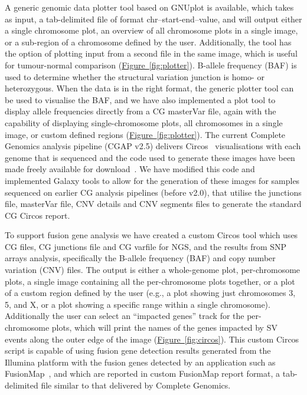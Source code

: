 A generic genomic data plotter tool based on GNUplot is available, which takes as input, a tab-delimited file of format chr–start-end–value, and will output either a single chromosome plot, an overview of all chromosome plots in a single image, or a sub-region of a chromosome defined by the user. Additionally, the tool has the option of plotting input from a second file in the same image, which is useful for tumour-normal comparison (\hyperref[fig:plotter]{Figure~\ref{fig:plotter}}). B-allele frequency (BAF) is used to determine whether the structural variation junction is homo- or heterozygous. When the data is in the right format, the generic plotter tool can be used to visualise the BAF, and we have also implemented a plot tool to display allele frequencies directly from a CG masterVar file, again with the capability of displaying single-chromosome plots, all chromosomes in a single image, or custom defined regions (\hyperref[fig:plotter]{Figure~\ref{fig:plotter}}). The current Complete Genomics analysis pipeline (CGAP v2.5) delivers Circos~\cite{url-circos} visualisations with each genome that is sequenced and the code used to generate these images have been made freely available for download~\cite{url-cgcircos}. We have modified this code and implemented Galaxy tools to allow for the generation of these images for samples sequenced on earlier CG analysis pipelines (before v2.0), that utilise the junctions file, masterVar file, CNV details and CNV segments files to generate the standard CG Circos report.


To support fusion gene analysis we have created a custom Circos tool which uses CG files, CG junctions file and CG varfile for NGS, and the results from SNP arrays analysis, specifically the B-allele frequency (BAF) and copy number variation (CNV) files. The output is either a whole-genome plot, per-chromosome plots, a single image containing all the per-chromosome plots together, or a plot of a custom region defined by the user (e.g., a plot showing just chromosomes 3, 5, and X, or a plot showing a specific range within a single chromosome). Additionally the user can select an “impacted genes” track for the per-chromosome plots, which will print the names of the genes impacted by SV events along the outer edge of the image (\hyperref[fig:circos]{Figure~\ref{fig:circos}}). This custom Circos script is capable of using fusion gene detection results generated from the Illumina platform with the fusion genes detected by an application such as FusionMap~\cite{ge2011fusionmap}, and which are reported in custom FusionMap report format, a tab-delimited file similar to that delivered by Complete Genomics.


